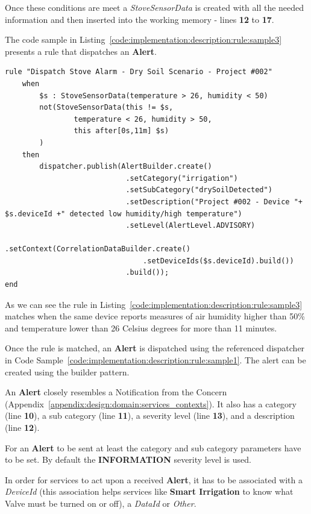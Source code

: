 Once these conditions are meet a \textit{StoveSensorData} is created with all the needed information and then inserted into the working memory - lines \textbf{12} to \textbf{17}.

The code sample in Listing~\ref{code:implementation:description:rule:sample3} presents a rule that dispatches an \textbf{Alert}.

\begin{lstlisting}[style=drools, caption=Rule Scenario Example - Part 3, label={code:implementation:description:rule:sample3}]
rule "Dispatch Stove Alarm - Dry Soil Scenario - Project #002"
    when
        $s : StoveSensorData(temperature > 26, humidity < 50)
        not(StoveSensorData(this != $s,
                temperature < 26, humidity > 50,
                this after[0s,11m] $s)
        )
    then
        dispatcher.publish(AlertBuilder.create()
                            .setCategory("irrigation")
                            .setSubCategory("drySoilDetected")
                            .setDescription("Project #002 - Device "+ $s.deviceId +" detected low humidity/high temperature")
                            .setLevel(AlertLevel.ADVISORY)
                            .setContext(CorrelationDataBuilder.create()
                                .setDeviceIds($s.deviceId).build())
                            .build());
end
\end{lstlisting}

As we can see the rule in Listing~\ref{code:implementation:description:rule:sample3} matches when the same device reports measures of air humidity higher than 50\% and temperature lower than 26 Celsius degrees for more than 11 minutes.

Once the rule is matched, an \textbf{Alert} is dispatched using the referenced dispatcher in Code Sample~\ref{code:implementation:description:rule:sample1}. The alert can be created using the builder pattern.

An \textbf{Alert} closely resembles a Notification from the  Concern  (Appendix~\ref{appendix:design:domain:services_contexts}). It also has a category (line \textbf{10}), a sub category (line \textbf{11}), a severity level (line \textbf{13}), and a description (line \textbf{12}).

For an \textbf{Alert} to be sent at least the category and sub category parameters have to be set. By default the \textbf{INFORMATION} severity level is used.

In order for services to act upon a received \textbf{Alert}, it has to be associated with a \textit{DeviceId} (this association helps services like \textbf{Smart Irrigation} to know what Valve must be turned on or off), a \textit{DataId} or \textit{Other}.

